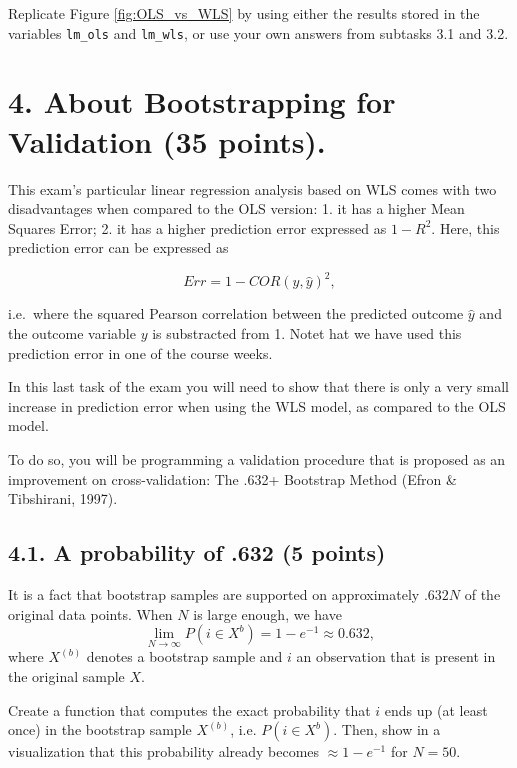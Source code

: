 \documentclass[]{article}
\begin{document}
Replicate Figure \ref{fig:OLS_vs_WLS} by using either the results stored
in the variables \texttt{lm\_ols} and \texttt{lm\_wls}, or use your own
answers from subtasks 3.1 and 3.2.

\newpage

\section{4. About Bootstrapping for Validation (35
points).}\label{about-bootstrapping-for-validation-35-points.}

This exam's particular linear regression analysis based on WLS comes
with two disadvantages when compared to the OLS version: 1. it has a
higher Mean Squares Error; 2. it has a higher prediction error expressed
as \(1 - R^2\). Here, this prediction error can be expressed as

\begin{equation}
Err = 1 - COR(y, \widehat{y})^2,
\end{equation}

i.e.~where the squared Pearson correlation between the predicted outcome
\(\widehat{y}\) and the outcome variable \(y\) is substracted from 1.
Notet hat we have used this prediction error in one of the course weeks.

In this last task of the exam you will need to show that there is only a
very small increase in prediction error when using the WLS model, as
compared to the OLS model.

To do so, you will be programming a validation procedure that is
proposed as an improvement on cross-validation: The .632+ Bootstrap
Method (Efron \& Tibshirani, 1997).

\subsection{4.1. A probability of .632 (5
points)}\label{a-probability-of-.632-5-points}

It is a fact that bootstrap samples are supported on approximately
\(.632N\) of the original data points. When \(N\) is large enough, we
have \[\lim_{N \to \infty} P(i \in X^{b}) = 1 - e^{-1} \approx 0.632,\]
where \(X^{(b)}\) denotes a bootstrap sample and \(i\) an observation
that is present in the original sample \(X\).

Create a function that computes the exact probability that \(i\) ends up
(at least once) in the bootstrap sample \(X^{(b)}\), i.e.
\(P(i \in X^{b})\). Then, show in a visualization that this probability
already becomes \(\approx 1 - e^{-1}\) for \(N = 50\).
\end{document}
